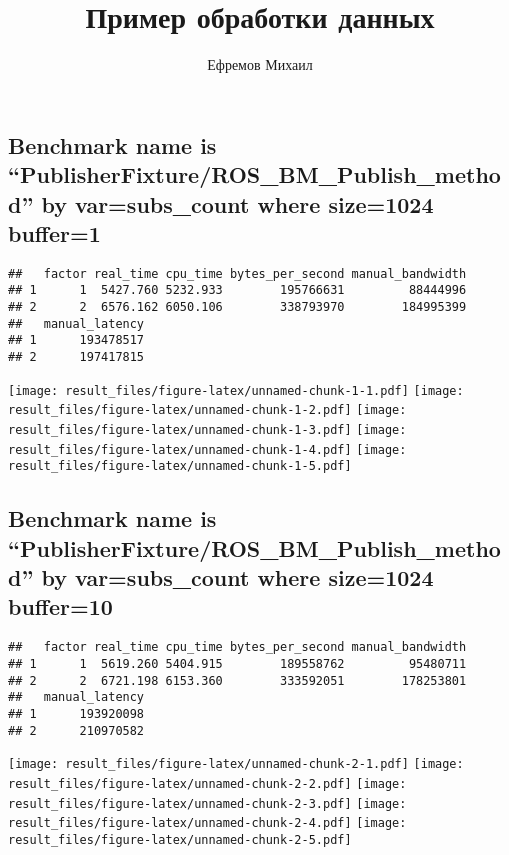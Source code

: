 \documentclass[]{article}
\title{Пример обработки данных}
\author{Ефремов Михаил}
\date{}
\begin{document}
\maketitle

{
\setcounter{tocdepth}{2}
\tableofcontents
}
\hypertarget{benchmark-name-is-publisherfixtureros_bm_publish_method-by-varsubs_count-where-size1024-buffer1}{%
\subsection{Benchmark name is
``PublisherFixture/ROS\_BM\_Publish\_method'' by var=subs\_count where
size=1024
buffer=1}\label{benchmark-name-is-publisherfixtureros_bm_publish_method-by-varsubs_count-where-size1024-buffer1}}

\begin{verbatim}
##   factor real_time cpu_time bytes_per_second manual_bandwidth
## 1      1  5427.760 5232.933        195766631         88444996
## 2      2  6576.162 6050.106        338793970        184995399
##   manual_latency
## 1      193478517
## 2      197417815
\end{verbatim}

\texttt{[image: result\_files/figure-latex/unnamed-chunk-1-1.pdf]}
\texttt{[image: result\_files/figure-latex/unnamed-chunk-1-2.pdf]}
\texttt{[image: result\_files/figure-latex/unnamed-chunk-1-3.pdf]}
\texttt{[image: result\_files/figure-latex/unnamed-chunk-1-4.pdf]}
\texttt{[image: result\_files/figure-latex/unnamed-chunk-1-5.pdf]}

\hypertarget{benchmark-name-is-publisherfixtureros_bm_publish_method-by-varsubs_count-where-size1024-buffer10}{%
\subsection{Benchmark name is
``PublisherFixture/ROS\_BM\_Publish\_method'' by var=subs\_count where
size=1024
buffer=10}\label{benchmark-name-is-publisherfixtureros_bm_publish_method-by-varsubs_count-where-size1024-buffer10}}

\begin{verbatim}
##   factor real_time cpu_time bytes_per_second manual_bandwidth
## 1      1  5619.260 5404.915        189558762         95480711
## 2      2  6721.198 6153.360        333592051        178253801
##   manual_latency
## 1      193920098
## 2      210970582
\end{verbatim}

\texttt{[image: result\_files/figure-latex/unnamed-chunk-2-1.pdf]}
\texttt{[image: result\_files/figure-latex/unnamed-chunk-2-2.pdf]}
\texttt{[image: result\_files/figure-latex/unnamed-chunk-2-3.pdf]}
\texttt{[image: result\_files/figure-latex/unnamed-chunk-2-4.pdf]}
\texttt{[image: result\_files/figure-latex/unnamed-chunk-2-5.pdf]}
\end{document}
